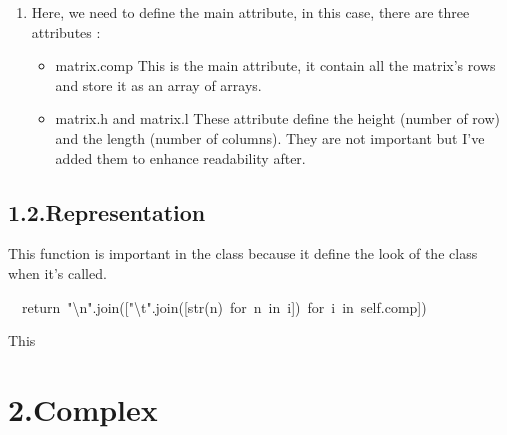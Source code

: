 \documentclass[10pt]{article}
\begin{document}
\begin{enumerate}[,start=3]%

\item{}
Here, we need to define the main attribute, in this case, there are three attributes :%

\begin{itemize}[noitemsep,topsep=\mdcompacttopsep]%

\item{}matrix.comp\mdbr
{}This is the main attribute, it contain all the matrix's rows and store it as an array of arrays.%

\item{}matrix.h and matrix.l\mdbr
{}These attribute define the height (number of row) and the length (number of columns). 
They are not important but I've added them to enhance readability after.%
\end{itemize}%
\end{enumerate}%

\subsection{1.2.\hspace*{0.5em}Representation}\label{mat-repr}%

\noindent{}This function is important in the class because it define the look of the class when it's called.%
\begin{mdpre}%
\noindent~~{return}~{"}{\textbackslash{}n}{"}.join([{"}{\textbackslash{}t}{"}.join([str(n)~{for}~n~{in}~i])~{for}~i~{in}~self.comp])%
\end{mdpre}\noindent{}This 
    

\section{2.\hspace*{0.5em}Complex}\label{sec-complex}%
\end{document}
